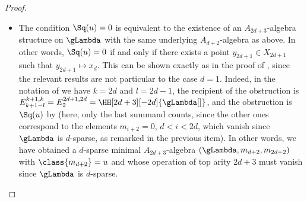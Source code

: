 \documentclass[a4paper]{amsart}
\begin{document}
\begin{proof}
\begin{itemize}
    minimal $A_{d+2}$-algebra structure $x_d\in X_d$ is simply a Hochschild
    cochain
    \[
      m_{d+2}\in\HC[d+2][-d]{\gLambda}[\gLambda],
    \]
    which we choose to be a representing cocycle of the unique class
    \begin{center}
      $u\in\HH[d+2][-d]{\gLambda}[\gLambda]\quad\text{with}\quad\Sq(u)=0\quad\text{and}\quad
      j^*(u)=x$
    \end{center}
    (compare with ). The fact that $m_{d+2}$
    is a cocycle implies that it extends to an $A_{d+3}$-algebra structure on
    $\gLambda$ choosing $m_{d+3}$ arbitrarily, e.g.~$m_{d+3}=0$ (this is
    actually the only possible choice if $d>1$). This is immediate from the
    definition of an $A_\infty$-algebra, see \cite[Sec.~3.1]{Kel01}. Thus, there
    exists a point $x_{d+1}\in X_{d+1}$ that maps to $x_d$ under the fibration
    $X_{d+1}\twoheadrightarrow X_d$. Moreover, the same argument shows that we
    can extend the $A_{d+3}$-algebra structure to an $A_{2d+2}$-algebra
    structure, necessarily setting $m_{i+2}=0$ for $d<i<2d$ and choosing
    $m_{2d+2}$ arbitrarily, for example~$m_{2d+2}=0$. Hence we have $x_{2d}\in X_{2d}$
    that maps to $x_d$ under the fibration $X_{2d}\twoheadrightarrow X_d$. In
    other words, the Hochschild cocycle $m_{d+2}$ with $\class{m_{d+2}}=u$ gives
    rise to a $d$-sparse minimal $A_{d+2}$-algebra $(\gLambda,m_{d+2})$ which
    can be extended to a $d$-sparse minimal $A_{2d+2}$-algebra
    $(\gLambda,m_{d+2},0)$, with all other operations being trivial due to the
    fact that $\gLambda$ is $d$-sparse. Notice, however, that
    $(\gLambda,m_{d+2},0,0,\ldots)$ \emph{need not} be an $A_\infty$-algebra
    since, although $\Sq(\class{m_{d+2}})=\Sq(u)=0$, the Gerstenhaber square of
    $m_{d+2}$ need not vanish at the cochain level.
    
  \item The condition $\Sq(u)=0$ is equivalent to the existence of an
    $A_{2d+3}$-algebra structure on $\gLambda$ with the same underlying
    $A_{d+2}$-algebra as above. In other words, $\Sq(u)=0$ if and only if there
    exists a point $y_{2d+1}\in X_{2d+1}$ such that $y_{2d+1}\mapsto x_d$. This
    can be shown exactly as in the proof of \cite[Prop.~6.7]{Mur20b}, since the
    relevant results \cite[Props.~3.4 and 5.4]{Mur20b} are not particular to the
    case $d=1$. Indeed, in the notation of \cite[Prop.~5.4]{Mur20b} we have
    $k=2d$ and $l=2d-1$, the recipient of the obstruction is
    $E^{k+1,k}_{k+1-l}=E^{2d+1,2d}_{2}=\HH[2d+3][-2d]{\gLambda[]}$, and the
    obstruction is $\Sq(u)$ by \cite[Prop.~3.4]{Mur20b} (here, only the last
    summand counts, since the other ones correspond to the elements $m_{i+2}=0$,
    $d<i<2d$, which vanish since $\gLambda$ is $d$-sparse, as remarked in the
    previous item). In other words, we have obtained a $d$-sparse minimal
    $A_{2d+3}$-algebra $(\gLambda,m_{d+2},m_{2d+2})$ with $\class{m_{d+2}}=u$
    and whose operation of top arity $2d+3$ must vanish since $\gLambda$ is
    $d$-sparse. 
  \end{itemize}
  

\end{proof}
\end{document}
